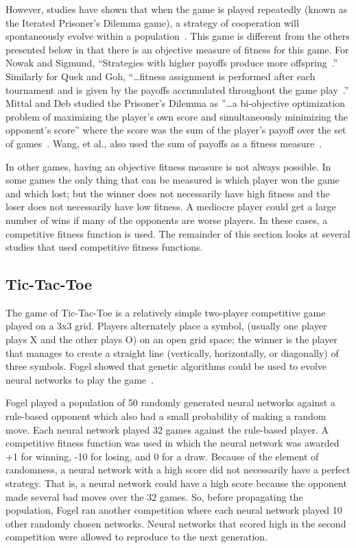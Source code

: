 However, studies have shown that when the game is played repeatedly (known as
the Iterated Prisoner's Dilemma game), a strategy of cooperation will
spontaneously evolve within a population~\cite{Axelrod1984, Nowak1993,
DBLP:conf/cig/QuekG07, Mittal2009, WangTao2010}. This game is different from the
others presented below in that there is an objective measure of fitness for this
game. For Nowak and Sigmund, ``Strategies with higher payoffs produce more
offspring~\cite{Nowak1993}.'' Similarly for Quek and Goh, ``\ldots fitness
assignment is performed after each tournament and is given by the payoffs
accumulated throughout the game play~\cite{DBLP:conf/cig/QuekG07}.'' Mittal and
Deb studied the Prisoner's Dilemma as ''\ldots a bi-objective optimization
problem of maximizing the player's own score and simultaneously minimizing the
opponent's score'' where the score was the sum of the player's payoff over the
set of games~\cite{Mittal2009}. Wang, et al., also used the sum of payoffs as a
fitness measure~\cite{WangTao2010}.

In other games, having an objective fitness measure is not always possible. In
some games the only thing that can be measured is which player won the game and
which lost; but the winner does not necessarily have high fitness and the loser
does not necessarily have low fitness. A mediocre player could get a large
number of wins if many of the opponents are worse players. In these cases, a
competitive fitness function is used. The remainder of this section looks
at several studies that used competitive fitness functions.

\subsection{Tic-Tac-Toe}

The game of Tic-Tac-Toe is a relatively simple two-player competitive game
played on a 3x3 grid. Players alternately place a symbol, (usually one player
plays X and the other plays O) on an open grid space; the winner is the player
that manages to create a straight line (vertically, horizontally, or diagonally)
of three symbols. Fogel showed that genetic algorithms could be used to evolve
neural networks to play the game~\cite{Fogel1993}.

Fogel played a population of 50 randomly generated neural networks against a
rule-based opponent which also had a small probability of making a random move.
Each neural network played 32 games against the rule-based player. A competitive
fitness function was used in which the neural network was awarded +1 for
winning, -10 for losing, and 0 for a draw. Because of the element of randomness,
a neural network with a high score did not necessarily have a perfect strategy.
That is, a neural network could have a high score because the opponent made
several bad moves over the 32 games. So, before propagating the population,
Fogel ran another competition where each neural network played 10 other randomly
chosen networks. Neural networks that scored high in the second competition were
allowed to reproduce to the next generation.


